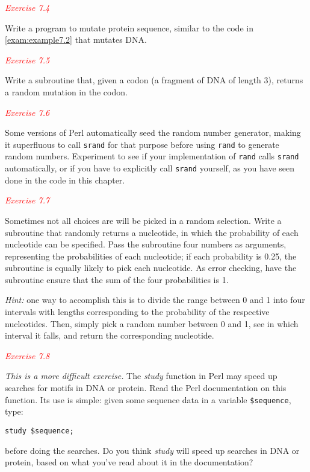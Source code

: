 \textcolor{red}{\textit{Exercise 7.4}}
\begin{adjustwidth}{2em}{}
Write a program to mutate protein sequence, similar to the code in \autoref{exam:example7.2} that mutates DNA. 
\end{adjustwidth}

\textcolor{red}{\textit{Exercise 7.5}}
\begin{adjustwidth}{2em}{}
Write a subroutine that, given a codon (a fragment of DNA of length 3), returns a random mutation in the codon. 
\end{adjustwidth}

\textcolor{red}{\textit{Exercise 7.6}}
\begin{adjustwidth}{2em}{}
Some versions of Perl automatically seed the random number generator, making it superfluous to call \verb|srand| for that purpose before using \verb|rand| to generate random numbers. Experiment to see if your implementation of \verb|rand| calls \verb|srand| automatically, or if you have to explicitly call \verb|srand| yourself, as you have seen done in the code in this chapter. 
\end{adjustwidth}

\textcolor{red}{\textit{Exercise 7.7}}
\begin{adjustwidth}{2em}{}
Sometimes not all choices are will be picked in a random selection. Write a subroutine that randomly returns a nucleotide, in which the probability of each nucleotide can be specified. Pass the subroutine four numbers as arguments, representing the probabilities of each nucleotide; if each probability is 0.25, the subroutine is equally likely to pick each nucleotide. As error checking, have the subroutine ensure that the sum of the four probabilities is 1.

\textit{Hint:} one way to accomplish this is to divide the range between 0 and 1 into four intervals with lengths corresponding to the probability of the respective nucleotides. Then, simply pick a random number between 0 and 1, see in which interval it falls, and return the corresponding nucleotide.
\end{adjustwidth}

\textcolor{red}{\textit{Exercise 7.8}}
\begin{adjustwidth}{2em}{}
\textit{This is a more difficult exercise.} The \textit{study} function in Perl may speed up searches for motifs in DNA or protein. Read the Perl documentation on this function. Its use is simple: given some sequence data in a variable \verb|$sequence|, type:

\begin{lstlisting}
study $sequence;
\end{lstlisting}

before doing the searches. Do you think \textit{study} will speed up searches in DNA or protein, based on what you've read about it in the documentation?
\end{adjustwidth}

